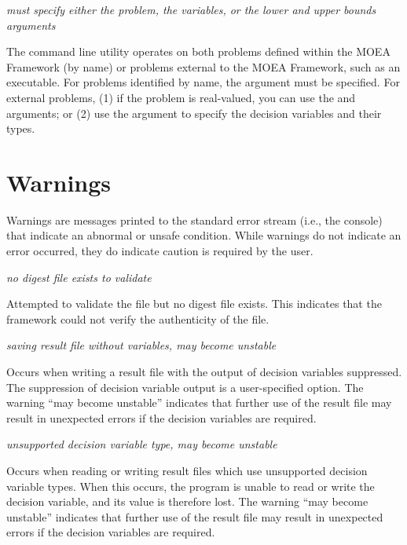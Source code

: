 \noindent
\textit{must specify either the problem, the variables, or the lower and upper bounds arguments}
\begin{indented}
  The  command line utility operates on both problems defined within the MOEA Framework (by name) or problems external to the MOEA Framework, such as an executable.  For problems identified by name, the  argument must be specified.  For external problems, (1) if the problem is real-valued, you can use the  and  arguments; or (2) use the  argument to specify the decision variables and their types.
\end{indented}





\section{Warnings}
Warnings are messages printed to the standard error stream (i.e., the console) that indicate an abnormal or unsafe condition.  While warnings do not indicate an error occurred, they do indicate caution is required by the user.
\vspace{\baselineskip}

\noindent
\textit{no digest file exists to validate }
\begin{indented}
  Attempted to validate the file but no digest file exists.  This indicates that the framework could not verify the authenticity of the file.
\end{indented}
  
\noindent
\textit{saving result file without variables, may become unstable}
\begin{indented}
  Occurs when writing a result file with the output of decision variables suppressed.  The suppression of decision variable output is a user-specified option.  The warning ``may become unstable'' indicates that further use of the result file may result in unexpected errors if the decision variables are required.
\end{indented}
  
\noindent
\textit{unsupported decision variable type, may become unstable}
\begin{indented}
  Occurs when reading or writing result files which use unsupported decision variable types.  When this occurs, the program is unable to read or write the decision variable, and its value is therefore lost.  The warning ``may become unstable'' indicates that further use of the result file may result in unexpected errors if the decision variables are required.
\end{indented}
  
